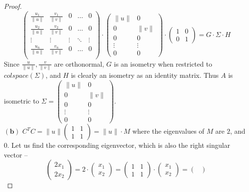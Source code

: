 \documentclass[11pt]{article}
\theoremstyle{quest}
\begin{document}
\begin{proof}
$$\begin{pmatrix}
\frac{u_1}{\|u\|} & \frac{v_1}{\|v\|} & 0 & \ldots & 0 \\
\frac{u_2}{\|u\|} & \frac{v_2}{\|v\|} & 0 & \ldots & 0 \\
\vdots & \vdots & \vdots & \ddots & \vdots \\
\frac{u_n}{\|u\|} & \frac{v_n}{\|v\|} & 0 & \ldots & 0 \\
\end{pmatrix} \cdot  \begin{pmatrix}
\|u\| & 0 \\
0 & \|v\| \\
0 & 0 \\
\vdots & \vdots \\
0 & 0
\end{pmatrix} \cdot \begin{pmatrix}
1 & 0 \\
0 & 1
\end{pmatrix} = G \cdot \Sigma \cdot H$$
Since $\frac{u}{\|u\|}, \frac{v}{\|v\|}$ are orthonormal, $G$ is an isometry when restricted to $colspace(\Sigma)$, and $H$ is clearly an isometry as an identity matrix. Thus $A$ is isometric to $\Sigma = \begin{pmatrix}
\|u\| & 0 \\
0 & \|v\| \\
0 & 0 \\
\vdots & \vdots \\
0 & 0
\end{pmatrix}$.
\\$\mathbf{(b)}$ $C^TC = \|u\| \begin{pmatrix}
1 & 1 \\
1 & 1
\end{pmatrix} = \|u\| \cdot M$ where the eigenvalues of $M$ are $2$, and $0$. Let us find the corresponding eigenvector, which is also the right singular vector --
$$\begin{pmatrix}
2x_1 \\
2x_2
\end{pmatrix} = 2 \cdot \begin{pmatrix}
x_1 \\
x_2
\end{pmatrix} = \begin{pmatrix}
1 & 1 \\
1 & 1
\end{pmatrix} \cdot \begin{pmatrix}
x_1 \\
x_2
\end{pmatrix} = \begin{pmatrix}

\end{pmatrix}$$
\end{proof}
\end{document}
